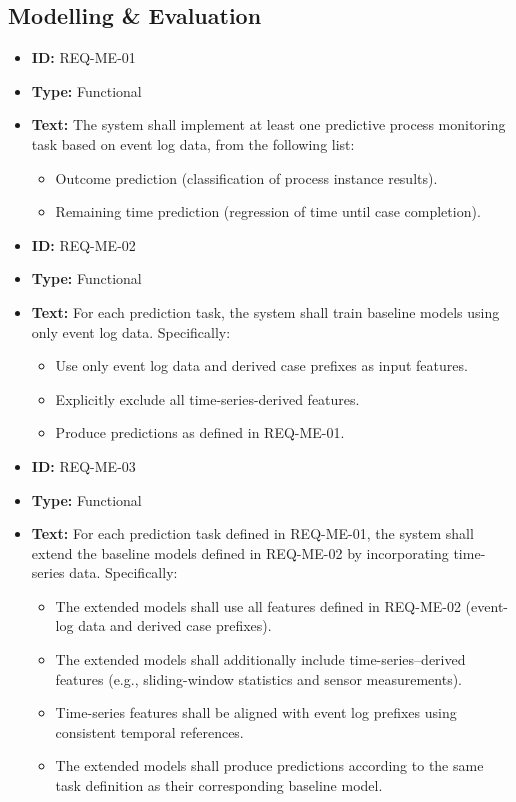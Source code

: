 \documentclass[runningheads]{llncs}
\begin{document}
\subsection{Modelling \& Evaluation}
\begin{itemize}
    \item \textbf{ID:} REQ-ME-01
    \item \textbf{Type:} Functional
    \item \textbf{Text:} The system shall implement at least one predictive process monitoring task based on event log data, from the following list:
          \begin{itemize}
              \item Outcome prediction (classification of process instance results).
              \item Remaining time prediction (regression of time until case completion).
          \end{itemize}

          \vspace{1em}
    \item \textbf{ID:} REQ-ME-02
    \item \textbf{Type:} Functional
    \item \textbf{Text:} For each prediction task, the system shall train baseline models using only event log data. Specifically:
          \begin{itemize}
              \item Use only event log data and derived case prefixes as input features.
              \item Explicitly exclude all time-series-derived features.
              \item Produce predictions as defined in REQ-ME-01.
          \end{itemize}

          \vspace{1em}
    \item \textbf{ID:} REQ-ME-03
    \item \textbf{Type:} Functional
    \item \textbf{Text:} For each prediction task defined in REQ-ME-01, the system shall extend the baseline models defined in REQ-ME-02 by incorporating time-series data. Specifically:
          \begin{itemize}
              \item The extended models shall use all features defined in REQ-ME-02 (event-log data and derived case prefixes).
              \item The extended models shall additionally include time-series–derived features (e.g., sliding-window statistics and sensor measurements).
              \item Time-series features shall be aligned with event log prefixes using consistent temporal references.
              \item The extended models shall produce predictions according to the same task definition as their corresponding baseline model.
          \end{itemize}


\end{itemize}
\end{document}
